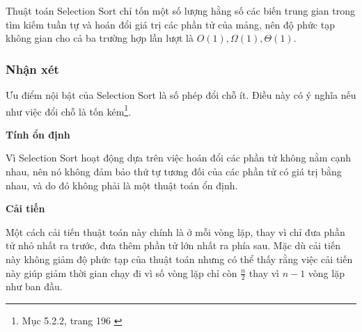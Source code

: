 Thuật toán Selection Sort chỉ tốn một số lượng hằng số các biến trung gian trong tìm kiếm tuần tự và hoán đổi giá trị các phần tử của mảng, nên độ phức tạp không gian cho cả ba trường hợp lần lượt là $O(1), \Omega(1), \Theta(1)$.

 

\subsubsection{Nhận xét}

Ưu điểm nội bật của Selection Sort là số phép đổi chỗ ít. Điều này có ý nghĩa nếu như việc đổi chỗ là tốn kém\footnote{Mục 5.2.2, trang 196 \cite{dsa_nghia_2013}}. 


\textbf{Tính ổn định} 

Vì Selection Sort hoạt động dựa trên việc hoán đổi các phần tử không nằm cạnh nhau, nên nó không đảm bảo thứ tự tương đối của các phần tử có giá trị bằng nhau, và do đó không phải là một thuật toán ổn định.


\textbf{Cải tiến} 

Một cách cải tiến thuật toán này chính là ở mỗi vòng lặp, thay vì chỉ đưa phần tử nhỏ nhất ra trước, đưa thêm phần tử lớn nhất ra phía sau. Mặc dù cải tiến này không giảm độ phức tạp của thuật toán nhưng có thể thấy rằng việc cải tiến này giúp giảm thời gian chạy đi vì số vòng lặp chỉ còn $\frac{n}{2}$ thay vì $n - 1$ vòng lặp như ban đầu.